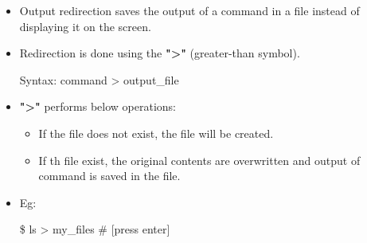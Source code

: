 \setlength{\columnsep}{3pt}
\begin{flushleft}
	\begin{itemize}
		\item Output redirection saves the output of a command in a file instead of displaying it on the screen.
		\item Redirection is done using the \textbf{">"} (greater-than symbol).
		\bigskip
		\begin{tcolorbox}[breakable,notitle,boxrule=-0pt,colback=pink,colframe=pink]
			\color{black}
			\font=9pt
			Syntax: command > output\_file
			\font=4pt
		\end{tcolorbox}
		\item \textbf{">"} performs below operations:
		\begin{itemize}
			\item If the file does not exist, the file will be created.
			\item If th file exist, the original contents are overwritten and output of command is saved in the file.
		\end{itemize}
		\item Eg:
		\begin{tcolorbox}[breakable,notitle,boxrule=-0pt,colback=black,colframe=black]
			\color{green}
			\font=9pt
			\$ ls > my\_files 			\color{yellow} \# [press enter]
			\font=4pt
		\end{tcolorbox}
		
	\end{itemize}

\end{flushleft}

